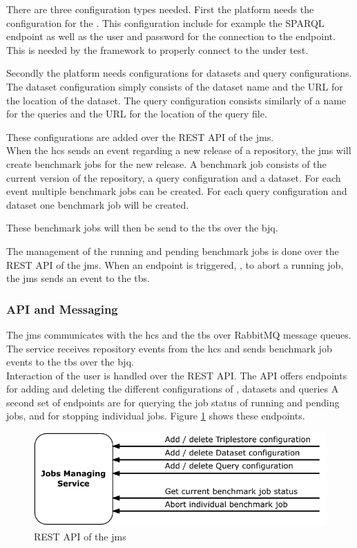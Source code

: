 There are three configuration types needed.
First the platform needs the configuration for the \ts{}.
This configuration include for example the SPARQL endpoint as well as the user and password for the connection to the endpoint.
This is needed by the \iguana{} framework to properly connect to the \ts{} under test\cite{IguanaDocumentationConfiguration}.

Secondly the platform needs configurations for datasets and query configurations.
The dataset configuration simply consists of the dataset name and the URL for the location of the dataset.
The query configuration consists similarly of a name for the queries and the URL for the location of the query file.

These configurations are added over the REST API of the \ac{jms}.
\\

When the \ac{hcs} sends an event regarding a new release of a repository, the \ac{jms} will create benchmark jobs for the new release.
A benchmark job consists of the current version of the repository, a query configuration and a dataset.
For each event multiple benchmark jobs can be created.
For each query configuration and dataset one benchmark job will be created.

These benchmark jobs will then be send to the \acl{tbs} over the \acl{bjq}.

The management of the running and pending benchmark jobs is done over the REST API of the \ac{jms}.
When an endpoint is triggered, \eg, to abort a running job, the \ac{jms} sends an event to the \acl{tbs}.


\subsubsection{API and Messaging}
\label{sec:jobs_api}
The \ac{jms} communicates with the \ac{hcs} and the \acl{tbs} over RabbitMQ message queues.
The service receives repository events from the \ac{hcs} and sends benchmark job events to the \acl{tbs} over the \ac{bjq}.
\\

Interaction of the user is handled over the REST API.
The API offers endpoints for adding and deleting the different configurations of \tsp{}, datasets and queries
A second set of endpoints are for querying the job status of running and pending jobs, and for stopping individual jobs.
Figure \ref{fig:rest_apis_approach_jms} shows these endpoints.
\begin{figure}[tbph]
	\centering
	\includegraphics[width=.57\textwidth]{figures/rest-apis-approach-jms.pdf}
	\caption{REST API of the \acl{jms}}
	\label{fig:rest_apis_approach_jms}
\end{figure}


